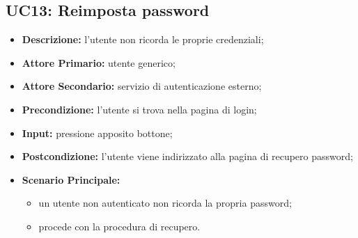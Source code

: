 \subsection{UC13: Reimposta password}
\label{sec:UC13}
\begin{itemize}
    \item \textbf{Descrizione:} l'utente non ricorda le proprie credenziali;
    \item \textbf{Attore Primario:} utente generico;
    \item \textbf{Attore Secondario:} servizio di autenticazione esterno;
    \item \textbf{Precondizione:} l'utente si trova nella pagina di login;
    \item \textbf{Input:} pressione apposito bottone;
    \item \textbf{Postcondizione:} l'utente viene indirizzato alla pagina di recupero password;
    \item \textbf{Scenario Principale:}
          \begin{itemize}
              \item un utente non autenticato non ricorda la propria password;
              \item procede con la procedura di recupero.
          \end{itemize}
\end{itemize}